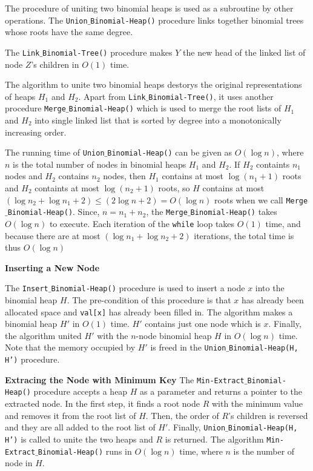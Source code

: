 \vskip 1mm
The procedure of uniting two binomial heaps is used as a subroutine by other operations.
\vskip 0.5mm
The {\tt Union$\_$Binomial-Heap()} procedure links together binomial trees whose roots have the same degree.

\vskip 1mm
The {\tt Link$\_$Binomial-Tree()} procedure makes $Y$ the new head of the linked list of node $Z$'s children in $O(1)$ time.

\vskip 1mm
The algorithm to unite two binomial heaps destorys the original representations of heaps $H_1$ and $H_2$. Apart from {\tt Link$\_$Binomial-Tree()}, it uses another procedure {\tt Merge$\_$Binomial-Heap()} which is used to merge the root lists of $H_1$ and $H_2$ into single linked list that is sorted by degree into a monotonically increasing order.

\vskip 1mm
The running time of {\tt Union$\_$Binomial-Heap()} can be given as $O(\log n)$, where $n$ is the total number of nodes in binomial heaps $H_1$ and $H_2$. If $H_2$ containts $n_1$ nodes and $H_2$ contains $n_2$ nodes, then $H_1$ contains at most $\log(n_1+1)$ roots and $H_2$ containts at most $\log(n_2+1)$ roots, so $H$ contains at most $(\log n_2 +\log n_1+2)\leq(2\log n+2)=O(\log n)$ roots when we call {\tt Merge$\_$Binomial-Heap()}. Since, $n=n_1+n_2$, the {\tt Merge$\_$Binomial-Heap()} takes $O(\log n)$ to execute. Each iteration of the {\tt while} loop takes $O(1)$ time, and because there are at most $(\log n_1+\log n_2+2)$ iterations, the total time is thus $O(\log n)$

\vskip 3mm
{\bf Inserting a New Node}

\vskip 1mm
The {\tt Insert$\_$Binomial-Heap()} procedure is used to insert a node $x$ into the binomial heap $H$. The pre-condition of this procedure is that $x$ has already been allocated space and {\tt val[x]} has already been filled in. The algorithm makes a binomial heap $H'$ in $O(1)$ time. $H'$ contains just one node which is $x$. Finally, the algorithm united $H'$ with the $n$-node binomial heap $H$ in $O(\log n)$ time. Note that the memory occupied by $H'$ is freed in the {\tt Union$\_$Binomial-Heap(H, H')} procedure.

\vskip 3mm
{\bf Extracing the Node with Minimum Key}
The {\tt Min-Extract$\_$Binomial-Heap()} procedure accepts a heap $H$ as a parameter and returns a pointer to the extracted node. In the first step, it finds a root node $R$ with the minimum value and removes it from the root list of $H$. Then, the order of $R$'s children is reversed and they are all added to the root list of $H'$. Finally, {\tt Union$\_$Binomial-Heap(H, H')} is called to unite the two heaps and $R$ is returned. The algorithm {\tt Min-Extract$\_$Binomial-Heap()} runs in $O(\log n)$ time, where $n$ is the number of node in $H$.

